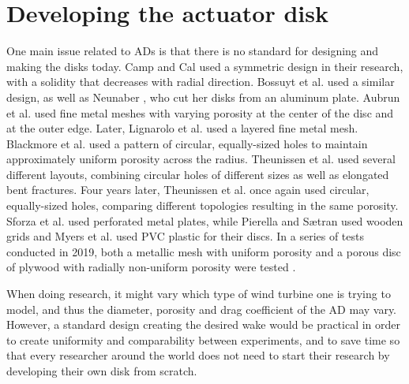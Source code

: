 \section{Developing the actuator disk}

One main issue related to \gls{AD}s is that there is no standard for designing and making the disks today. Camp and Cal \cite{Camp2016, Camp2019} used a symmetric design in their research, with a solidity that decreases with radial direction. Bossuyt et al. \cite{Bossuyt2016} used a similar design, as well as Neunaber \cite{Neunaber}, who cut her disks from an aluminum plate. Aubrun et al. \cite{Aubrun2013} used fine metal meshes with varying porosity at the center of the disc and at the outer edge. Later, Lignarolo et al. \cite{Lignarolo2016} used a layered fine metal mesh. Blackmore et al. \cite{Blackmore2013} used a pattern of circular, equally-sized holes to maintain approximately uniform porosity across the radius. Theunissen et al. \cite{Theunissen2014} used several different layouts, combining circular holes of different sizes as well as elongated bent fractures. Four years later, Theunissen et al. \cite{Theunissen2019} once again used circular, equally-sized holes, comparing different topologies resulting in the same porosity. Sforza et al. \cite{Sforza1981} used perforated metal plates, while Pierella and Sætran \cite{Pierella2010} used wooden grids and Myers et al. \cite{Myers2010} used PVC plastic for their discs. In a series of tests conducted in 2019, both a metallic mesh with uniform porosity and a porous disc of plywood with radially non-uniform porosity were tested \cite{Aubrun2019}.

When doing research, it might vary which type of wind turbine one is trying to model, and thus the diameter, porosity and drag coefficient of the \gls{AD} may vary. However, a standard design creating the desired wake would be practical in order to create uniformity and comparability between experiments, and to save time so that every researcher around the world does not need to start their research by developing their own disk from scratch.  






